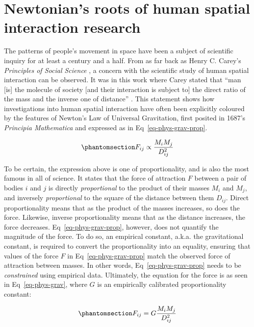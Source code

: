 \documentclass[
  10pt,
  letterpaper,
]{article}
\begin{document}
\section{Newtonian's roots of human spatial interaction
research}\label{newtonians-roots-of-human-spatial-interaction-research}

The patterns of people's movement in space have been a subject of
scientific inquiry for at least a century and a half. From as far back
as Henry C. Carey's \emph{Principles of Social Science}
\citep{careyPrinciplesSocialScience1858}, a concern with the scientific
study of human spatial interaction can be observed. It was in this work
where Carey stated that ``man {[}is{]} the molecule of society {[}and
their interaction is subject to{]} the direct ratio of the mass and the
inverse one of distance'' \citep[pp.~37-38]{mckeanManual1883}. This
statement shows how investigations into human spatial interaction have
often been explicitly coloured by the features of Newton's Law of
Universal Gravitation, first posited in 1687's \emph{Principia
Mathematica} and expressed as in Eq~\ref{eq-phys-grav-prop}.

\begin{equation}\phantomsection\label{eq-phys-grav-prop}{
F_{ij} \propto \frac{M_i M_j} {D_{ij}^{2}}
}\end{equation}

To be certain, the expression above is one of proportionality, and is
also the most famous in all of science. It states that the force of
attraction \(F\) between a pair of bodies \(i\) and \(j\) is directly
\emph{proportional} to the product of their masses \(M_i\) and \(M_j\),
and inversely \emph{proportional} to the square of the distance between
them \(D_{ij}\). Direct proportionality means that as the product of the
masses increases, so does the force. Likewise, inverse proportionality
means that as the distance increases, the force decreases.
Eq~\ref{eq-phys-grav-prop}, however, does not quantify the magnitude of
the force. To do so, an empirical constant, a.k.a. the gravitational
constant, is required to convert the proportionality into an equality,
ensuring that values of the force \(F\) in Eq~\ref{eq-phys-grav-prop}
match the observed force of attraction between masses. In other words,
Eq~\ref{eq-phys-grav-prop} needs to be \emph{constrained} using
empirical data. Ultimately, the equation for the force is as seen in
Eq~\ref{eq-phys-grav}, where \(G\) is an empirically calibrated
proportionality constant:

\begin{equation}\phantomsection\label{eq-phys-grav}{
F_{ij} = G \frac{M_i M_j} {D_{ij}^{2}}
}\end{equation}
\end{document}
